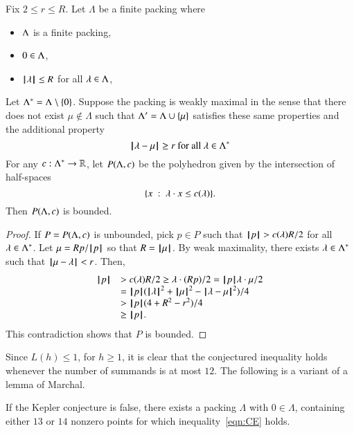 \begin{lemma}\label{lemma:poly-bounded} 
Fix $2\le r\le R$.
Let $\Lambda$ be a finite packing where 
\begin{itemize}
  \item $\Lambda$ is a finite packing, 
  \item $0\in\Lambda$,
  \item ${{\hskip0.1em|\hskip-0.15em|\hskip0.1em}\lambda{\hskip0.1em|\hskip-0.15em|\hskip0.1em}}\le R$ for all $\lambda\in\Lambda$,
\end{itemize}
Let $\Lambda^*=\Lambda\setminus\{0\}$.
Suppose the packing is weakly maximal in the sense that there does not exist $\mu\not\in\Lambda$ such that $\Lambda'=\Lambda\cup\{\mu\}$ satisfies these same properties
and the additional property
 $$
{\hskip0.1em|\hskip-0.15em|\hskip0.1em}\lambda - \mu{\hskip0.1em|\hskip-0.15em|\hskip0.1em}\ge r \text{ for all } \lambda\in\Lambda^*
 $$
For any $c:\Lambda^*\to\mathbb{R}$, let $P(\Lambda,c)$ be the
polyhedron given by the intersection of half-spaces
$$
\{x \ :\  \lambda\cdot x \le c(\lambda)\}.
$$
Then $P(\Lambda,c)$ is bounded.
\end{lemma}

\begin{proof}  If $P=P(\Lambda,c)$ is unbounded, pick $p\in P$ such that
${{\hskip0.1em|\hskip-0.15em|\hskip0.1em}p{\hskip0.1em|\hskip-0.15em|\hskip0.1em}} > c(\lambda) R/2$ for all $\lambda\in\Lambda^*$.  Let $\mu =  R p/{{\hskip0.1em|\hskip-0.15em|\hskip0.1em}p{\hskip0.1em|\hskip-0.15em|\hskip0.1em}}$ so that $R={{\hskip0.1em|\hskip-0.15em|\hskip0.1em}\mu{\hskip0.1em|\hskip-0.15em|\hskip0.1em}}$.  By weak maximality, there exists $\lambda\in\Lambda^*$ such that ${\hskip0.1em|\hskip-0.15em|\hskip0.1em}\mu - \lambda{\hskip0.1em|\hskip-0.15em|\hskip0.1em}<r$.    Then,
$$
\begin{array}{lll}
\normo{p} &> c(\lam) R/2 \ge \lam\cdot (R p)/2 = \normo{p} \lam\cdot \mu /2\\
  &= \normo{p} (\normo{\lam}^2 + \normo{\mu}^2 - \norm{\lam}{\mu}^2)/4\\
  &> \normo{p}(4+R^2-r^2)/4\\
  &\ge \normo{p}.
\end{array}
$$
This contradiction shows that $P$ is bounded.
\end{proof}




Since $L(h)\le 1$, for $h\ge1$, it is clear that the conjectured inequality holds whenever the number of summands is at most $12$. The following is a variant of a lemma of Marchal.


\begin{lemma}\label{lemma:13-14}  
If the Kepler conjecture is false, there exists a packing $\Lambda$ with $0\in\Lambda$, containing either $13$ or $14$ nonzero points for which inequality~\ref{eqn:CE} holds.
\end{lemma}


